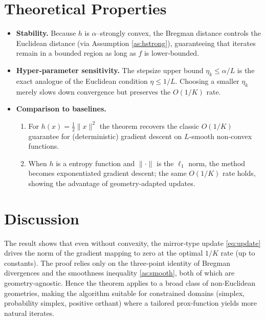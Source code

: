 \documentclass{article}
\begin{document}
\section*{Theoretical Properties}
\begin{itemize}[leftmargin=*]
\item \textbf{Stability.} Because $h$ is $\alpha$–strongly convex, the Bregman distance controls the Euclidean distance (via Assumption \ref{as:hstrong}), guaranteeing that iterates remain in a bounded region as long as $f$ is lower‑bounded.
\item \textbf{Hyper‑parameter sensitivity.} The stepsize upper bound $\eta_k\le\alpha/L$ is the exact analogue of the Euclidean condition $\eta\le 1/L$. Choosing a smaller $\eta_k$ merely slows down convergence but preserves the $O(1/K)$ rate.
\item \textbf{Comparison to baselines.}
    \begin{enumerate}
        \item For $h(x)=\frac12\|x\|^{2}$ the theorem recovers the classic $O(1/K)$ guarantee for (deterministic) gradient descent on $L$‑smooth non‑convex functions.
        \item When $h$ is a entropy function and $\|\cdot\|$ is the $\ell_{1}$ norm, the method becomes exponentiated gradient descent; the same $O(1/K)$ rate holds, showing the advantage of geometry‑adapted updates.
    \end{enumerate}
\end{itemize}

\section*{Discussion}
The result shows that even without convexity, the mirror‑type update \eqref{eq:update} drives the norm of the gradient mapping to zero at the optimal $1/K$ rate (up to constants). The proof relies only on the three‑point identity of Bregman divergences and the smoothness inequality \eqref{as:smooth}, both of which are geometry‑agnostic. Hence the theorem applies to a broad class of non‑Euclidean geometries, making the algorithm suitable for constrained domains (simplex, probability simplex, positive orthant) where a tailored prox‑function yields more natural iterates.

\newpage
\end{document}
